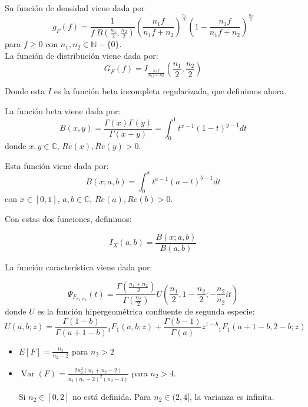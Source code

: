   Su función de densidad viene dada por
  \[
  g_F(f) = \frac{1}{f \ B(\frac{n_1}{2}, \frac{n_2}{2})} (\frac{n_1 f}{n_1 f + n_2})^{\frac{n_1}{2}} (1- \frac{n_1f}{n_1f + n_2})^{\frac{n_2}{2}}
  \]
  para $f \geq 0$ con $n_1,n_2 \in \mathbb N -\{0\}$.\\

  La función de distribución viene dada por:
  \[
G_F(f) = I_{\frac{n_1f}{n_1f + n2}}(\frac{n_1}{2},\frac{n_2}{2})
\]

Donde esta $I$ es la función beta incompleta regularizada, que definimos ahora.

\begin{ndef}
  La función beta viene dada por:
  \[
B(x,y) = \frac{\Gamma(x) \Gamma(y)}{\Gamma(x+y)} = \int_0^1 t^{x-1} (1-t)^{y-1} dt
  \]
  donde $x,y \in \mathbb C$, $Re(x),Re(y) > 0$.
\end{ndef}
\begin{ndef}
  Esta función viene dada por:
  \[
B(x;a,b) = \int_0^x t^{a-1}(a-t)^{b-1} dt
\]
con $x \in [0,1]$, $a,b\in \mathbb C$, $Re(a),Re(b) > 0$.
\end{ndef}
Con estas dos funciones, definimos:
\begin{ndef}
  \[
I_X(a,b) = \frac{B(x;a,b)}{B(a,b)}
  \]
\end{ndef}

\begin{nprop}
  La función característica viene dada por:

  \[
\Psi_{F_{n_1,n_2}}(t) = \frac{\Gamma(\frac{n_1+n_2}{2})}{\Gamma(\frac{n_2}{2})} U(\frac{n_1}{2},1-\frac{n_2}{2}; -\frac{n_2}{n_2}it)
\]
donde $U$ es la función hipergeométrica confluente de segunda especie:
\[
U(a,b;z) = \frac{\Gamma(1-b)}{\Gamma(a+1-b)}{}_1F_1(a,b;z) + \frac{\Gamma(b-1)}{\Gamma(a)}z^{1-b}{}_1F_1(a+1-b,2-b;z)
\]
\end{nprop}

\begin{nprop}
  \begin{itemize}
  \item $E[F] = \frac{n_2}{n_2-2}$ para $n_2 > 2$
  \item $\operatorname{Var}(F) = \frac{2 n_2^2(n_1+n_2 - 2)}{n_1(n_2-2)^2 (n_2-4)}$ para $n_2 > 4$.

    Si $n_2\in [0,2]$ no está definida. Para $n_2 \in (2,4]$, la varianza es infinita.
  \end{itemize}
\end{nprop}


